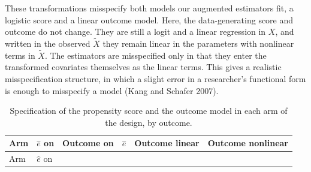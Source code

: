 \documentclass[
  12pt,
  a4paper,
]{article}
\begin{document}
These transformations misspecify both models our augmented estimators
fit, a logistic score and a linear outcome model. Here, the
data-generating score and outcome do not change. They are still a logit
and a linear regression in \(X\), and written in the observed
\(\tilde{X}\) they remain linear in the parameters with nonlinear terms
in \(\tilde{X}\). The estimators are misspecified only in that they
enter the transformed covariates themselves as the linear terms. This
gives a realistic misspecification structure, in which a slight error in
a researcher's functional form is enough to misspecify a model (Kang and
Schafer 2007).

\begin{longtable}[]{@{}
  >{\raggedright\arraybackslash}p{}
  >{\centering\arraybackslash}p{}
  >{\centering\arraybackslash}p{}
  >{\centering\arraybackslash}p{}
  >{\centering\arraybackslash}p{}
  >{\centering\arraybackslash}p{}@{}}
\caption{Specification of the propensity score and the outcome model in
each arm of the design, by outcome.}\label{tbl-spec}\tabularnewline
\toprule\noalign{}
\begin{minipage}[b]{\linewidth}\raggedright
Arm
\end{minipage} & \begin{minipage}[b]{\linewidth}\centering
\(\hat{e}\) on
\end{minipage} & \begin{minipage}[b]{\linewidth}\centering
Outcome on
\end{minipage} & \begin{minipage}[b]{\linewidth}\centering
\(\hat{e}\)
\end{minipage} & \begin{minipage}[b]{\linewidth}\centering
Outcome linear
\end{minipage} & \begin{minipage}[b]{\linewidth}\centering
Outcome nonlinear
\end{minipage} \\
\midrule\noalign{}
\endfirsthead
\toprule\noalign{}
\begin{minipage}[b]{\linewidth}\raggedright
Arm
\end{minipage} & \begin{minipage}[b]{\linewidth}\centering
\(\hat{e}\) on

\end{minipage}
\end{longtable}
\end{document}

